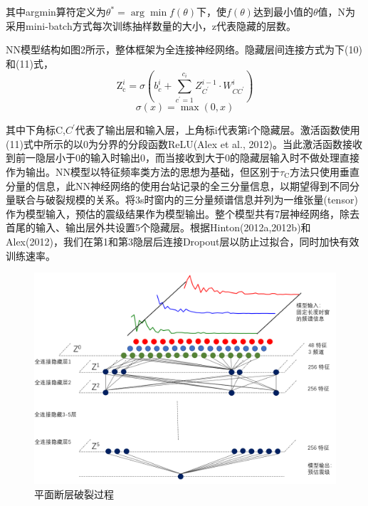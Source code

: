其中arg⁡min算符定义为$\theta^{*}=\arg \min f(\theta)$下，使$f(\theta)$达到最小值的$\theta$值，N为采用mini-batch方式每次训练抽样数量的大小，z代表隐藏的层数。

\indent NN模型结构如图2所示，整体框架为全连接神经网络。隐藏层间连接方式为下(10)和(11)式，
\begin{equation}
\mathrm{Z}_{\mathrm{c}}^{i}=\sigma\left(b_{c}^{i}+\sum_{c^{\prime}=1}^{c_{i}} Z_{C^{\prime}}^{i-1} \cdot W_{C C^{\prime}}^{i}\right)
\end{equation}
\begin{equation}
\sigma(x)=\max (0, x)
\end{equation}



其中下角标C,$C^{\prime}$代表了输出层和输入层，上角标i代表第i个隐藏层。激活函数使用(11)式中所示的以0为分界的分段函数ReLU(Alex et al., 2012)。当此激活函数接收到前一隐层小于0的输入时输出0，而当接收到大于0的隐藏层输入时不做处理直接作为输出。NN模型以特征频率类方法的思想为基础，但区别于$\tau_{\mathrm{C}}$方法只使用垂直分量的信息，此NN神经网络的使用台站记录的全三分量信息，以期望得到不同分量联合与破裂规模的关系。将3s时窗内的三分量频谱信息并列为一维张量(tensor)作为模型输入，预估的震级结果作为模型输出。整个模型共有7层神经网络，除去首尾的输入、输出层外共设置5个隐藏层。根据Hinton(2012a,2012b)和Alex(2012)，我们在第1和第3隐层后连接Dropout层以防止过拟合，同时加快有效训练速率。

    
\begin{figure}[!h]
  \centerin
  \includegraphics[width=0.99\linewidth]{img/NN.png}
    \caption{ 平面断层破裂过程} \label{fig:rupture-process}
 \end{figure}

